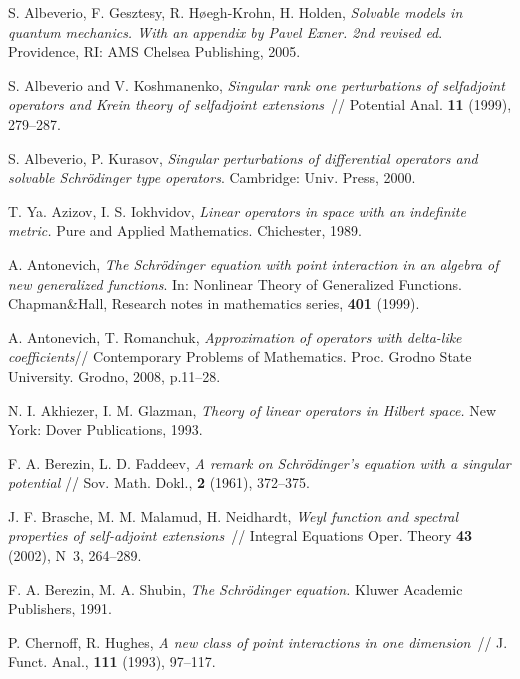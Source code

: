 \documentclass[11pt,english]{amsart}
\begin{document}
\begin{thebibliography}{99}

 S. Albeverio,  F. Gesztesy,  R. H{\o}egh-Krohn,  H. Holden,
\textit{Solvable models in quantum mechanics. With an appendix by Pavel Exner. 2nd revised ed}.
Providence, RI: AMS Chelsea Publishing, 2005.

S. Albeverio and V. Koshmanenko, \textit{Singular rank one perturbations of selfadjoint
operators and Krein theory of selfadjoint extensions}~// Potential Anal. \textbf{11}
(1999), 279--287.

 S. Albeverio, P. Kurasov,  \textit{Singular perturbations of differential operators
and solvable Schr\"{o}dinger type operators}.  Cambridge: Univ. Press, 2000.

T. Ya. Azizov, I. S. Iokhvidov,  \textit{Linear operators in space with an indefinite metric.} Pure and Applied Mathematics. Chichester, 1989.

 A. Antonevich, \textit{The Schr\"{o}dinger
equation with point interaction in an algebra of new generalized functions}. In: Nonlinear
Theory of Generalized Functions. Chapman\&Hall, Research notes in mathematics series,
\textbf{401} (1999).

 A. Antonevich, T. Romanchuk, \textit{Approximation of operators with delta-like coefficients}// Contemporary Problems of Mathematics. Proc. Grodno State University. Grodno, 2008, p.11--28.

N. I. Akhiezer, I. M. Glazman, \textit{Theory of linear operators in Hilbert space.}
New York: Dover Publications, 1993.

F. A. Berezin, L. D. Faddeev, \textit{A remark on Schr\"odinger's equation with a singular potential} // Sov. Math. Dokl., \textbf{2} (1961), 372--375.

J. F. Brasche, M. M. Malamud, H. Neidhardt, \textit{Weyl function and spectral properties
of self-adjoint extensions}~// Integral Equations Oper. Theory \textbf{43} (2002), N~3,
264--289.

 F. A. Berezin, M. A. Shubin,
\textit{The Schr\"{o}dinger equation.} Kluwer Academic
Publishers, 1991.

  P. Chernoff,  R. Hughes, \textit{A new class of
point interactions in one dimension}~// J. Funct. Anal., \textbf{111} (1993), 97--117.


\end{thebibliography}
\end{document}
